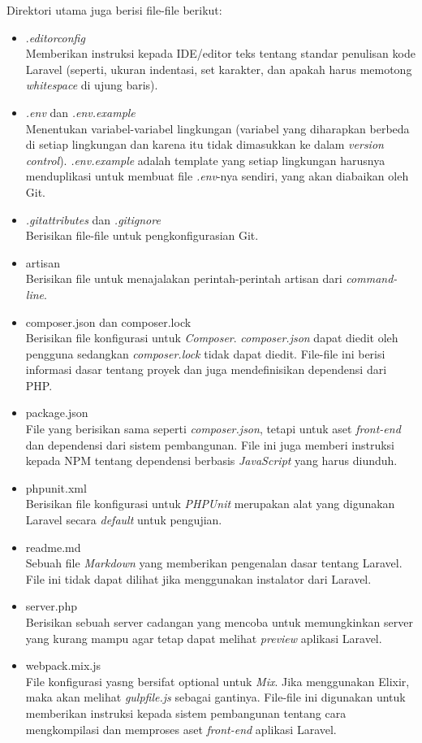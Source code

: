 Direktori utama juga berisi file-file berikut:
	\begin{itemize}
		\item .\textit{editorconfig} \\
		Memberikan instruksi kepada IDE/editor teks  tentang standar penulisan kode Laravel (seperti, ukuran indentasi, set karakter, dan apakah harus memotong \textit{whitespace} di ujung baris).
		\item \textit{.env }dan \textit{.env.example} \\
		Menentukan variabel-variabel lingkungan (variabel yang diharapkan berbeda di setiap lingkungan dan karena itu tidak dimasukkan ke dalam \textit{version control}). \textit{.env.example} adalah template yang setiap lingkungan harusnya menduplikasi untuk membuat file \textit{.env}-nya sendiri, yang akan diabaikan oleh Git.
		\item \textit{.gitattributes} dan \textit{.gitignore} \\
		Berisikan file-file untuk pengkonfigurasian Git.
		\item artisan \\
		Berisikan file untuk menajalakan perintah-perintah artisan dari \textit{command-line}.
		\item composer.json dan composer.lock \\
		Berisikan file konfigurasi untuk \textit{Composer}. \textit{composer.json} dapat diedit oleh pengguna sedangkan \textit{composer.lock} tidak dapat diedit. File-file ini berisi informasi dasar tentang proyek dan juga mendefinisikan dependensi dari PHP.
		\item package.json \\
		File yang berisikan sama seperti \textit{composer.json}, tetapi untuk aset \textit{front-end} dan dependensi dari sistem pembangunan. File ini juga memberi instruksi kepada NPM tentang dependensi berbasis \textit{JavaScript} yang harus diunduh.
		\item phpunit.xml \\
		Berisikan file konfigurasi untuk \textit{PHPUnit} merupakan alat yang digunakan Laravel secara \textit{default} untuk pengujian.
		\item readme.md \\
		Sebuah file \textit{Markdown} yang memberikan pengenalan dasar tentang Laravel. File ini tidak dapat dilihat jika menggunakan instalator dari Laravel.
		\item server.php \\
		Berisikan sebuah server cadangan yang mencoba untuk memungkinkan server yang kurang mampu agar tetap dapat melihat \textit{preview} aplikasi Laravel.
		\item webpack.mix.js \\
		File konfigurasi yasng bersifat optional untuk \textit{Mix}. Jika menggunakan Elixir, maka akan melihat \textit{gulpfile.js} sebagai gantinya. File-file ini digunakan untuk memberikan instruksi kepada sistem pembangunan tentang cara mengkompilasi dan memproses aset \textit{front-end }aplikasi Laravel.
	\end{itemize}



